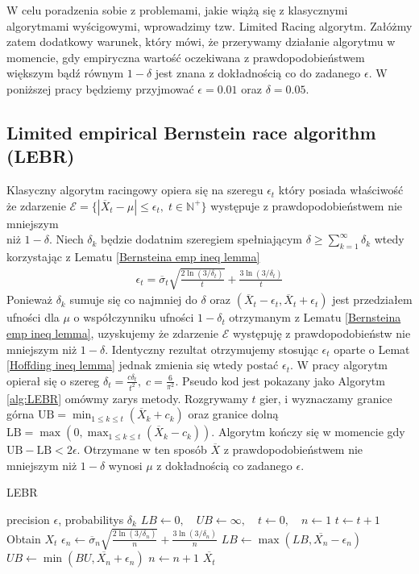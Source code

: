 \documentclass[inzynierska]{pwr_wmat_praca_dyplomowa}
\theoremstyle{plain}
\numberwithin{theorem}{chapter}
\theoremstyle{definition}
\numberwithin{theorem}{chapter}
\begin{document}
	W celu poradzenia sobie z problemami, jakie wiążą się z klasycznymi algorytmami wyścigowymi, wprowadzimy  tzw. Limited Racing algorytm. Załóżmy zatem dodatkowy warunek, który mówi, że przerywamy działanie algorytmu w momencie, gdy empiryczna wartość oczekiwana z prawdopodobieństwem większym bądź równym $1-\delta$ jest znana z dokładnością co do zadanego $\epsilon$. W poniższej pracy będziemy przyjmować $\epsilon=0.01$ oraz $\delta = 0.05$.
	\subsection{Limited empirical Bernstein race algorithm (LEBR)}
	Klasyczny algorytm racingowy opiera się na szeregu $\epsilon_t$ który posiada właściwość że zdarzenie $\mathcal{E}= \{|\overline{X}_t - \mu | \le \epsilon_t,\; t\in \mathbb{N}^+\}$ występuje z prawdopodobieństwem nie mniejszym 
	\\niż $1-\delta$. Niech $\delta_k$ będzie dodatnim szeregiem spełniającym $ \delta \ge \displaystyle\sum_{k = 1}^{\infty}\delta_k$ wtedy korzystając z Lematu \ref{Bernsteina emp ineq lemma}
	\begin{gather*}
		\label{eq:LEBR epsilon}
		\epsilon_t =  \overline{\sigma}_t \sqrt{\frac{2\ln(3/\delta_t)}{t}} + \frac{3  \ln{(3 / \delta_t)}}{t}
	\end{gather*}
	Ponieważ $\delta_k$ sumuje się co najmniej do $\delta$ oraz $(\overline{X}_t - \epsilon_t, \overline{X}_t + \epsilon_t)$ jest przedziałem ufności dla $\mu$ o współczynniku ufności $1-\delta_t$ 
	otrzymanym z Lematu \ref{Bernsteina emp ineq lemma}, uzyskujemy że zdarzenie $\mathcal{E}$ występuję z prawdopodobieństw nie mniejszym niż $1-\delta$. Identyczny rezultat otrzymujemy stosując $\epsilon_t$ oparte o Lemat \ref{Hoffding ineq lemma} jednak zmienia się wtedy postać $\epsilon_t$. W pracy \cite{cauwet2018surprising} algorytm opierał się o szereg $\delta_t=\frac{c\delta_t}{t^2},\; c=\frac{6}{\pi^2}$.
	Pseudo kod jest pokazany jako Algorytm \ref{alg:LEBR} omówmy zarys metody. Rozgrywamy $t$ gier, i wyznaczamy granice górna $\text{UB} = \displaystyle\min_{1\le k\le t}( \overline{X}_k+c_k)$  oraz granice dolną $\text{LB} = \max(0,\displaystyle\max_{1\le k\le t}(\overline{X}_k-c_k))$. Algorytm kończy się w momencie gdy $\text{UB}-\text{LB}< 2\epsilon$. Otrzymane w ten sposób $\overline{X}$ z prawdopodobieństwem nie mniejszym niż $1 - \delta$ wynosi $\mu$ z dokładnością co zadanego $\epsilon$. 
	\begin{algorithm}[H]
		\caption{LEBR}\label{alg:LEBR}
		\begin{algorithmic}
			\Ensure precision $\epsilon$, probabilitys $\delta_k$
			\State $LB \gets 0, \quad UB \gets \infty, \quad t \gets 0,\quad n \gets 1$ 
			\State $t \gets t + 1$
			\State Obtain $X_t$				
			\State $\epsilon_n \gets \overline{\sigma}_n \sqrt{\frac{2\ln(3/\delta_n)}{n}} + \frac{3  \ln{(3 / \delta_n)}}{n}$ 
			\State $LB \gets \max(LB,  \overline{X_n} - \epsilon_n)$
			\State $UB \gets \min(BU,  \overline{X_n} + \epsilon_n)$
			\State $n \gets n + 1$
			\EndWhile
			\State \Return $ \overline{X_t}$		
		\end{algorithmic}
	\end{algorithm}
\end{document}
